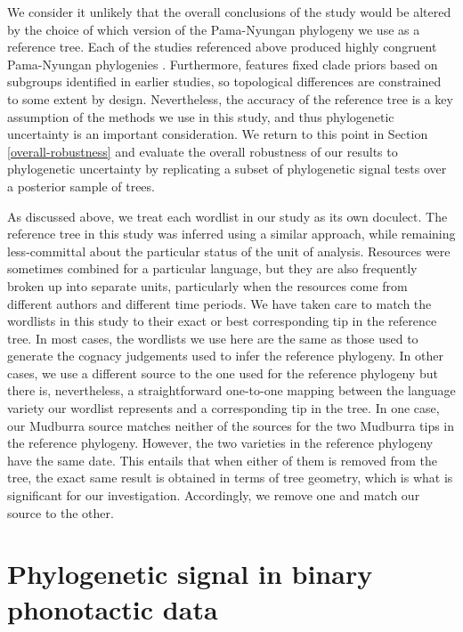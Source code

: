 We consider it unlikely that the overall conclusions of the study would be altered by the choice of which version of the Pama-Nyungan phylogeny we use as a reference tree. Each of the studies referenced above produced highly congruent Pama-Nyungan phylogenies \autocite[for a detailed comparison, see][]{bouckaert_origin_2018}. Furthermore, \textcite{bouckaert_origin_2018} features fixed clade priors based on subgroups identified in earlier studies, so topological differences are constrained to some extent by design. Nevertheless, the accuracy of the reference tree is a key assumption of the methods we use in this study, and thus phylogenetic uncertainty is an important consideration. We return to this point in Section \ref{overall-robustness} and evaluate the overall robustness of our results to phylogenetic uncertainty by replicating a subset of phylogenetic signal tests over a posterior sample of trees.

As discussed above, we treat each wordlist in our study as its own doculect. The reference tree in this study was inferred using a similar approach, while remaining less-committal about the particular status of the unit of analysis. Resources were sometimes combined for a particular language, but they are also frequently broken up into separate units, particularly when the resources come from different authors and different time periods. We have taken care to match the wordlists in this study to their exact or best corresponding tip in the reference tree. In most cases, the wordlists we use here are the same as those used to generate the cognacy judgements used to infer the reference phylogeny. In other cases, we use a different source to the one used for the reference phylogeny but there is, nevertheless, a straightforward one-to-one mapping between the language variety our wordlist represents and a corresponding tip in the tree. In one case, our Mudburra source \autocite{nash_mudburra_1988} matches neither of the sources for the two Mudburra tips in the reference phylogeny. However, the two varieties in the reference phylogeny have the same date. This entails that when either of them is removed from the tree, the exact same result is obtained in terms of tree geometry, which is what is significant for our investigation. Accordingly, we remove one and match our source to the other.

\hypertarget{phy-sig-bin}{%
\section{Phylogenetic signal in binary phonotactic data}\label{phy-sig-bin}}

